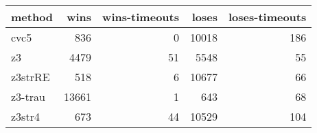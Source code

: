 \begin{tabular}{lrrrr}
\hline
 method   &   wins &   wins-timeouts &   loses &   loses-timeouts \\
\hline
 cvc5     &    836 &               0 &   10018 &              186 \\
 z3       &   4479 &              51 &    5548 &               55 \\
 z3strRE  &    518 &               6 &   10677 &               66 \\
 z3-trau  &  13661 &               1 &     643 &               68 \\
 z3str4   &    673 &              44 &   10529 &              104 \\
\hline
\end{tabular}
